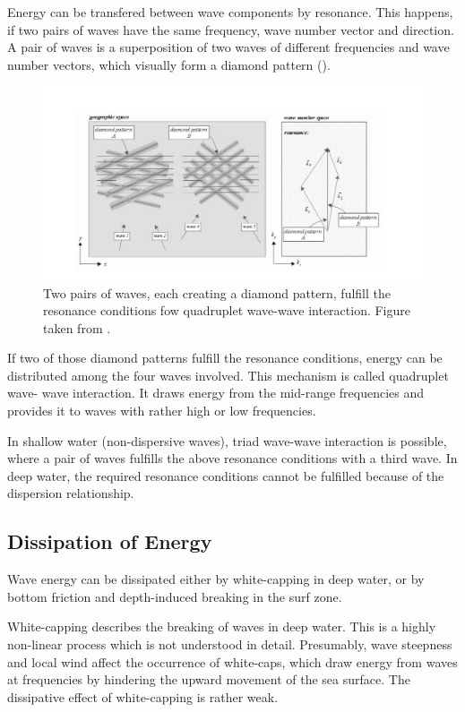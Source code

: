 Energy can be transfered between wave components by resonance. This happens, if 
two pairs of waves have the same frequency, wave number vector and direction. A 
pair of waves is a superposition of two waves of different frequencies and wave 
number vectors, which visually form a diamond pattern ().
\begin{figure}[ht]
 \includegraphics[width=15cm]{bilder/diamond.png}
 \caption{Two pairs of waves, each creating a diamond pattern, fulfill the 
resonance conditions fow quadruplet wave-wave interaction. Figure taken from 
\cite{holthuijsen2007}. \label{diamond}}
\end{figure}

If two of those diamond patterns fulfill the resonance conditions, energy can 
be distributed among the four waves involved. This mechanism is called 
quadruplet wave- wave interaction. It draws energy from the mid-range 
frequencies and provides it to waves with rather high or low frequencies. 

In shallow water (non-dispersive waves), triad wave-wave interaction is 
possible, where a pair of waves fulfills the above resonance conditions with a 
third wave. In deep water, the required resonance conditions cannot be 
fulfilled because of the dispersion relationship.

\subsection{Dissipation of Energy}

Wave energy can be dissipated either by white-capping in deep 
water, or by bottom friction and depth-induced breaking in the surf zone. 

White-capping describes the breaking of waves in deep water. This is a 
highly non-linear process which is not understood in detail. Presumably, wave 
steepness and local wind affect the occurrence of white-caps, which draw energy 
from waves at frequencies by hindering the upward movement of the sea surface. 
The dissipative effect of white-capping is rather weak.

